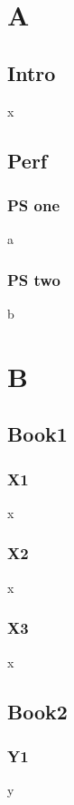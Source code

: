 \documentclass{book}\makeatletter\@addtoreset{chapter}{part}\makeatother
\begin{document}
\part{A}\chapter{Intro}x\chapter{Perf}\section{PS one}a\section{PS two}b
\part{B}\chapter{Book1}\section{X1}x\section{X2}x\section{X3}x\chapter{Book2}\section{Y1}y
\end{document}
